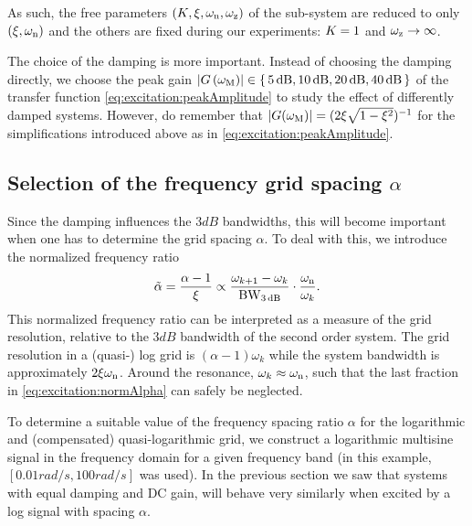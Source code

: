   As such, the free parameters $(K_{}, \xi_{}, \omega_{\mathrm{n}}, \omega_{\mathrm{z}})$ of the sub-system are reduced to only $(\xi_{}, \omega_{\mathrm{n}})$ and the others are fixed during our experiments: $K_{} = 1$ and $\omega_{\mathrm{z}} \to \infty$.


  The choice of the damping is more important.
  Instead of choosing the damping directly, we choose the peak gain $\left| G\left( \omega_{\mathrm{M}} \right) \right| \in \set{5 \ensuremath{\,\mathrm{dB}}, 10 \ensuremath{\,\mathrm{dB}}, 20 \ensuremath{\,\mathrm{dB}}, 40 \ensuremath{\,\mathrm{dB}} }$ of the transfer function \eqref{eq:excitation:peakAmplitude} to study the effect of differently damped systems.
  However, do remember that $\left| G(\omega_{\mathrm{M}}) \right| = (2\xi_{}\sqrt{1-\xi_{}^2})^{-1}$ for the simplifications introduced above as in \eqref{eq:excitation:peakAmplitude}.

  \subsection{Selection of the frequency grid spacing $\alpha$}
  Since the damping influences the $3\unit{dB}$ bandwidths, this will become important when one has to determine the grid spacing $\alpha$.
  To deal with this, we introduce the normalized frequency ratio
  \begin{equation}
    \tilde{\alpha} = \frac{\alpha - 1}
                          {\xi_{}}
                   \propto \frac{\omega_{k+1} - \omega_k}
                                {\mathrm{BW}_{3\,\mathrm{dB}}}
                           \cdot
                           \frac{\omega_{\mathrm{n}}}{\omega_k}
    \text{.}
    \label{eq:excitation:normAlpha} 
  \end{equation}
  This normalized frequency ratio can be interpreted as a measure of the grid resolution, relative to the $3\unit{dB}$ bandwidth of the second order system.
  The grid resolution in a (quasi-) log grid is $\left( \alpha - 1\right)\omega_k$ while the system bandwidth is approximately $2\xi_{}\omega_{\mathrm{n}}$.
  Around the resonance, $\omega_k \approx \omega_{\mathrm{n}}$, such that the last fraction in \eqref{eq:excitation:normAlpha} can safely be neglected.
  
  To determine a suitable value of the frequency spacing ratio $\alpha$ for the logarithmic and (compensated) quasi-logarithmic grid, we construct a logarithmic multisine signal in the frequency domain for a given frequency band (in this example, $\left[ 0.01 \unit{rad/s}, 100 \unit{rad/s}\right]$ was used).
  In the previous section we saw that systems with equal damping and \gls{DC} gain, will behave very similarly when excited by a log signal with spacing $\alpha$.

